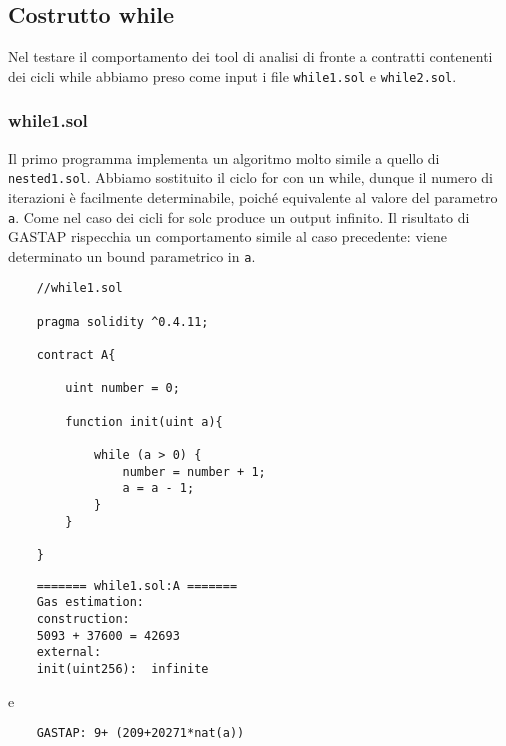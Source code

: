     \subsection{Costrutto while}
    
    Nel testare il comportamento dei tool di analisi di fronte a contratti contenenti dei cicli while abbiamo preso come input i file \verb|while1.sol| e \verb|while2.sol|.\newline
    
    \subsubsection{while1.sol}
    
    \indent Il primo programma implementa un algoritmo molto simile a quello di \verb|nested1.sol|. Abbiamo sostituito il ciclo for con un while, dunque il numero di iterazioni è facilmente determinabile, poiché equivalente al valore del parametro \verb|a|. Come nel caso dei cicli for solc produce un output infinito. Il risultato di GASTAP rispecchia un comportamento simile al caso precedente: viene determinato un bound parametrico in \verb|a|.\newline
    
    \begin{minipage}{\linewidth}
    \begin{lstlisting}
    //while1.sol

    pragma solidity ^0.4.11;

    contract A{

        uint number = 0;

        function init(uint a){
            
            while (a > 0) {
                number = number + 1;
                a = a - 1;
            }
        }

    }
    \end{lstlisting}
    \end{minipage}
    
    \begin{minipage}{\linewidth}
    \begin{lstlisting}
    ======= while1.sol:A =======
    Gas estimation:
    construction:
    5093 + 37600 = 42693
    external:
    init(uint256):	infinite
    \end{lstlisting}
    \end{minipage}

    
    e 
    \begin{lstlisting} 
    GASTAP: 9+ (209+20271*nat(a))
    \end{lstlisting}
    
